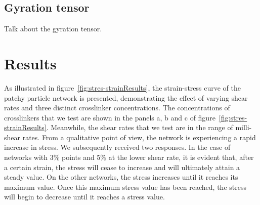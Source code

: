 \subsection{Gyration tensor}

Talk about the gyration tensor.

\section{Results}


As illustrated in figure~\ref{fig:stres-strainResults}, the strain-stress curve of the patchy particle network is presented, demonstrating the effect of varying shear rates and three distinct crosslinker concentrations.
The concentrations of crosslinkers that we test are shown in the panels a, b and c of figure~\ref{fig:stres-strainResults}.
Meanwhile, the shear rates that we test are in the range of milli-shear rates.
From a qualitative point of view, the network is experiencing a rapid increase in stress.
We subsequently received two responses.
In the case of networks with 3\% points and 5\% at the lower shear rate, it is evident that, after a certain strain, the stress will cease to increase and will ultimately attain a steady value.
On the other networks, the stress increases until it reaches its maximum value.
Once this maximum stress value has been reached, the stress will begin to decrease until it reaches a stress value.

